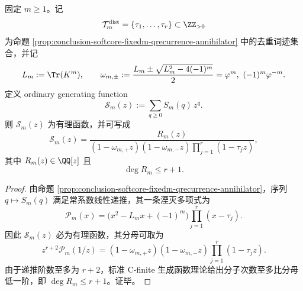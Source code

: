 \begin{theorem}[固定 \(m\) 的 \(q\)-向碰撞序列之有理母函数]\label{thm:conclusion-softcore-fixedm-qseries-rational-ogf}
固定 \(m\ge 1\)。记
\[
\mathcal T_m^{\mathrm{dist}}=\{\tau_1,\dots,\tau_r\}\subset \ZZ_{>0}
\]
为命题 \ref{prop:conclusion-softcore-fixedm-qrecurrence-annihilator} 中的去重词迹集合，并记
\[
L_m:=\Tr(K^m),
\qquad
\omega_{m,\pm}:=\frac{L_m\pm\sqrt{L_m^2-4(-1)^m}}{2}
=\varphi^m,\ (-1)^m\varphi^{-m}.
\]
定义 ordinary generating function
\[
\mathcal S_m(z):=\sum_{q\ge 0}S_m(q)\,z^q.
\]
则 \(\mathcal S_m(z)\) 为有理函数，并可写成
\[
\mathcal S_m(z)
=
\frac{R_m(z)}
{(1-\omega_{m,+}z)(1-\omega_{m,-}z)\prod_{j=1}^{r}(1-\tau_j z)},
\]
其中 \(R_m(z)\in\QQ[z]\) 且
\[
\deg R_m\le r+1.
\]
\end{theorem}
\begin{proof}
由命题 \ref{prop:conclusion-softcore-fixedm-qrecurrence-annihilator}，序列 \(q\mapsto S_m(q)\) 满足常系数线性递推，其一条湮灭多项式为
\[
\mathcal P_m(x)=
\bigl(x^2-L_mx+(-1)^m\bigr)\prod_{j=1}^{r}(x-\tau_j).
\]
因此 \(\mathcal S_m(z)\) 必为有理函数，其分母可取为
\[
z^{r+2}\mathcal P_m(1/z)
=
(1-\omega_{m,+}z)(1-\omega_{m,-}z)\prod_{j=1}^{r}(1-\tau_j z).
\]
由于递推阶数至多为 \(r+2\)，标准 C-finite 生成函数理论给出分子次数至多比分母低一阶，即 \(\deg R_m\le r+1\)。证毕。
\end{proof}

